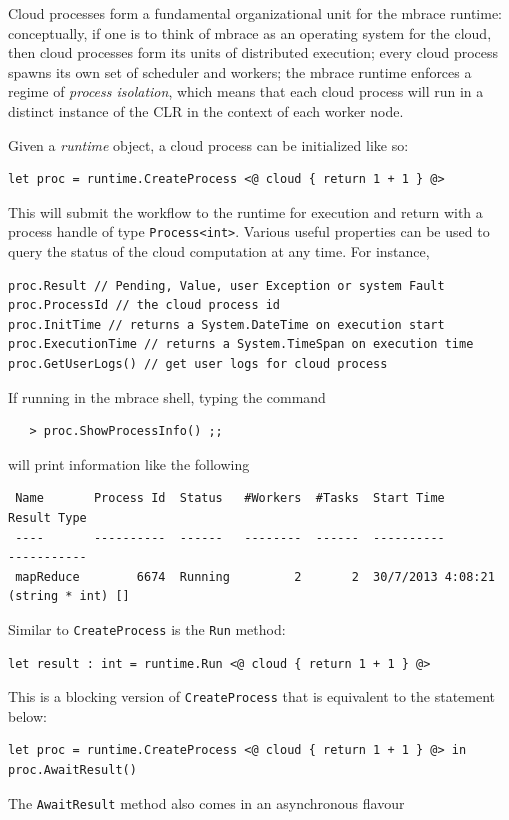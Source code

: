 \documentclass[9pt,a4paper]{article}
\newcommand{\mbrace}{mbrace}
\begin{document}
Cloud processes form a fundamental organizational unit for the \mbrace{} runtime:
conceptually, if one is to think of \mbrace{} as an operating system for the cloud,
then cloud processes form its units of distributed execution;
every cloud process spawns its own set of scheduler and workers;
the \mbrace{} runtime enforces a regime of \emph{process isolation},
which means that each cloud process will run in a distinct instance of the CLR in the context
of each worker node.

Given a \emph{runtime} object, a cloud process can be initialized like so:
\begin{lstlisting}
let proc = runtime.CreateProcess <@ cloud { return 1 + 1 } @>
\end{lstlisting}
This will submit the workflow to the runtime for execution and return with a process handle of
type \texttt{Process<int>}. Various useful properties can be used to query the status of the
cloud computation at any time. For instance,
\begin{lstlisting}
proc.Result // Pending, Value, user Exception or system Fault
proc.ProcessId // the cloud process id
proc.InitTime // returns a System.DateTime on execution start
proc.ExecutionTime // returns a System.TimeSpan on execution time
proc.GetUserLogs() // get user logs for cloud process
\end{lstlisting}
If running in the \mbrace{} shell, typing the command
\begin{verbatim}
   > proc.ShowProcessInfo() ;;
\end{verbatim}
will print information like the following
\begin{verbatim}
 Name       Process Id  Status   #Workers  #Tasks  Start Time         Result Type       
 ----       ----------  ------   --------  ------  ----------         -----------       
 mapReduce        6674  Running         2       2  30/7/2013 4:08:21  (string * int) [] 
\end{verbatim}
Similar to \texttt{CreateProcess} is the \texttt{Run} method:
\begin{lstlisting}
let result : int = runtime.Run <@ cloud { return 1 + 1 } @>
\end{lstlisting}
This is a blocking version of \texttt{CreateProcess} that is equivalent to the statement below:
\begin{lstlisting}
let proc = runtime.CreateProcess <@ cloud { return 1 + 1 } @> in
proc.AwaitResult()
\end{lstlisting}
%
The \texttt{AwaitResult} method also comes in an asynchronous flavour
\end{document}
